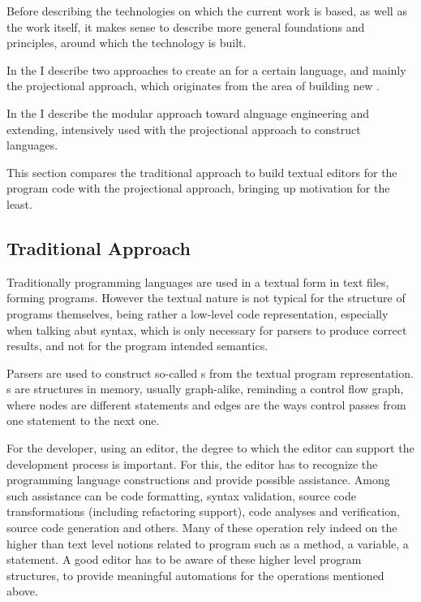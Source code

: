 
Before describing the technologies on which the current work is based, as well as the work itself,
it makes sense to describe more general foundations and principles, around which the technology is built.

In the  I describe two approaches to create an  for a certain language, and mainly the 
projectional approach, which originates from the area of building new .

In the  I describe the modular approach toward alnguage engineering and extending, intensively
used with the projectional approach to construct languages.



This section compares the traditional approach to build textual editors for the program code with
the projectional approach, bringing up  motivation for the least.

\subsection{Traditional Approach}
Traditionally programming languages are used in a textual form in text files, forming programs.
However the textual nature is not typical for the structure of programs themselves, being rather a low-level code representation, especially when talking abut syntax, which is only necessary for 
parsers to produce correct results, and not for the program intended semantics.


Parsers are used to construct so-called s from the textual 
program representation. s are structures in memory, usually graph-alike, 
reminding a control flow graph, where nodes are different statements and edges are 
the ways control passes from one statement to the next one.

For the developer, using an editor, the degree to which the editor can support the development
process is important. For this, the editor has to recognize the programming language constructions and provide possible assistance. Among such assistance can be code formatting, syntax validation,
source code transformations (including refactoring support), code analyses and verification, 
source code generation and others. Many of these operation rely indeed on the higher than text level notions related to program such as a method, a variable, a statement. 
A good editor has to be aware of these higher level program structures, to provide meaningful automations for the operations mentioned above.

